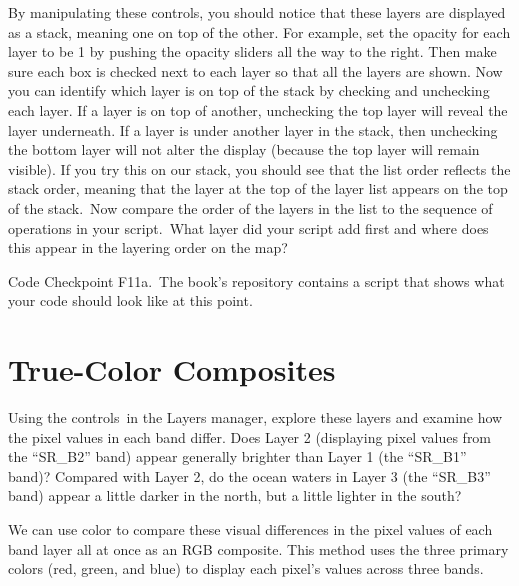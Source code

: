 \documentclass[
  letterpaper,
  DIV=11,
  numbers=noendperiod]{scrreprt}
\begin{document}
By manipulating these controls, you should notice that these layers are
displayed as a stack, meaning one on top of the other. For example, set
the opacity for each layer to be 1 by pushing the opacity sliders all
the way to the right. Then make sure each box is checked next to each
layer so that all the layers are shown. Now you can identify which layer
is on top of the stack by checking and unchecking each layer. If a layer
is on top of another, unchecking the top layer will reveal the layer
underneath. If a layer is under another layer in the stack, then
unchecking the bottom layer will not alter the display (because the top
layer will remain visible). If you try this on our stack, you should see
that the list order reflects the stack order, meaning that the layer at
the top of the layer list appears on the top of the stack.~Now compare
the order of the layers in the list to the sequence of operations in
your script.~What layer did your script add first and where does this
appear in the layering order on the map?

\begin{tcolorbox}[enhanced jigsaw, left=2mm, breakable, rightrule=.15mm, opacityback=0, colframe=quarto-callout-note-color-frame, colbacktitle=quarto-callout-note-color!10!white, arc=.35mm, opacitybacktitle=0.6, toptitle=1mm, colback=white, leftrule=.75mm, title=\textcolor{quarto-callout-note-color}{\faInfo}\hspace{0.5em}{Note}, toprule=.15mm, bottomtitle=1mm, titlerule=0mm, bottomrule=.15mm, coltitle=black]

Code Checkpoint F11a.~The book's repository contains a script that shows
what your code should look like at this point.

\end{tcolorbox}

\hypertarget{true-color-composites}{%
\section{True-Color Composites}\label{true-color-composites}}

Using the controls~in the Layers manager, explore these layers and
examine how the pixel values in each band differ. Does Layer 2
(displaying pixel values from the ``SR\_B2'' band) appear generally
brighter than Layer 1 (the ``SR\_B1'' band)? Compared with Layer 2, do
the ocean waters in Layer 3 (the ``SR\_B3'' band) appear a little darker
in the north, but a little lighter in the south? ~

We can use color to compare these visual differences in the pixel values
of each band layer all at once as an RGB composite. This method uses the
three primary colors (red, green, and blue) to display each pixel's
values across three bands.
\end{document}
